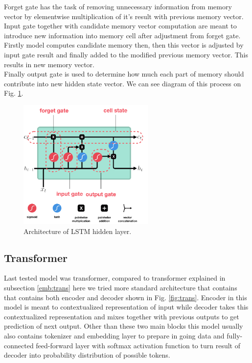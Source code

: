 Forget gate has the task of removing unnecessary information from memory vector by elementwise multiplication of it's result with previous memory vector. 
\\

Input gate together with candidate memory vector computation are meant to introduce new information into memory cell after adjustment from forget gate. Firstly model computes candidate memory then, then this vector is adjusted by input gate result and finally added to the modified previous memory vector. This results in new memory vector.
\\

Finally output gate is used to determine how much each part of memory should contribute into new hidden state vector. We can see diagram of this process on Fig. \ref{fig:lstm_arch}.

 
\begin{figure}[!h]
	\centering
 	
	\includegraphics[width=0.6\textwidth]{images/LSTM_arch.png}
 	
 	\caption{Architecture of LSTM hidden layer.}
 	\label{fig:lstm_arch}
\end{figure}

\subsection{Transformer}

Last tested model was transformer, compared to transformer explained in subsection \ref{emb:trans} here we tried more standard architecture that contains that contains both encoder and decoder shown in Fig. \ref{fig:trans}. Encoder in this model is meant to contextualized representation of input while decoder takes this contextualized representation and mixes together with previous outputs to get prediction of next output. Other than these two main blocks this model usually also contains tokenizer and embedding layer to prepare in going data and fully-connected feed-forward layer with softmax activation function to turn result of decoder into probability distribution of possible tokens.  
\\


